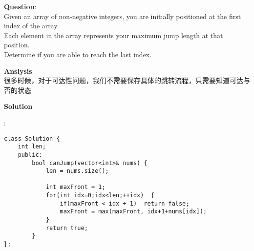    
\begin{description}
    \item{\textbf{Question}}:\\%
	Given an array of non-negative integers, you are initially positioned at the first index of the array.\\
	Each element in the array represents your maximum jump length at that position.\\
	Determine if you are able to reach the last index.\\

    \item{\textbf{Anslysis}}\\
		很多时候，对于可达性问题，我们不需要保存具体的跳转流程，只需要知道可达与否的状态\\

    \item{\textbf{Solution}}\\
	\item{} : \\
		\begin{lstlisting}
class Solution {
	int len;
	public:
		bool canJump(vector<int>& nums) {
			len = nums.size();

			int maxFront = 1;
			for(int idx=0;idx<len;++idx)  {
				if(maxFront < idx + 1)	return false;
				maxFront = max(maxFront, idx+1+nums[idx]);
			}
			return true;
		}
};		\end{lstlisting}

\end{description}

